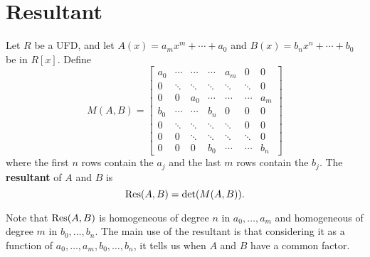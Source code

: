 \section{Resultant}\label{resultant}
\begin{df}
Let $R$ be a UFD, and let $A(x)=a_mx^m+\cdots +a_0$ and $B(x)=b_nx^n+\cdots +b_0$ be in $R[x]$.
Define
\[
M(A,B)=
\begin{bmatrix}a_{0} & \cdots & \cdots & \cdots & a_{m} & 0 & 0\\
0 & \ddots & \ddots & \ddots & \ddots & \ddots & 0\\
0 & 0 & a_{0} & \cdots & \cdots & \cdots & a_{m}\\
b_{0} & \cdots & \cdots & b_{n} & 0 & 0 & 0\\
0 & \ddots & \ddots & \ddots & \ddots & 0 & 0\\
0 & 0 & \ddots & \ddots & \ddots & \ddots & 0\\
0 & 0 & 0 & b_{0} & \cdots & \cdots & b_{n}
\end{bmatrix}
\]
where the first $n$ rows contain the $a_j$ and the last $m$ rows contain the $b_j$.
The \textbf{resultant} of $A$ and $B$ is
\[
\operatorname{Res}(A,B)=\det(M(A,B)).
\]
\end{df}
Note that $\operatorname{Res}(A,B)$ is homogeneous of degree $n$ in $a_0,\ldots, a_m$ and homogeneous of degree $m$ in $b_0,\ldots, b_n$. The main use of the resultant is that considering it as a function of $a_0,\ldots, a_m,b_0,\ldots, b_n$, it tells us when $A$ and $B$ have a common factor.

